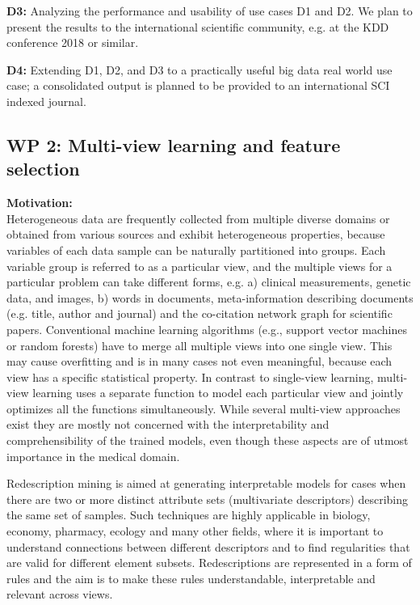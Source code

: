 \documentclass[a4paper,11pt]{article}
\begin{document}
\textbf{D3:} Analyzing the performance and usability of use cases  D1 and D2. We plan to present the results to the international scientific community, e.g. at the KDD conference 2018 or similar.

\textbf{D4:} Extending D1, D2, and D3 to a practically useful big data real world use case; a consolidated output is planned to be provided to an international SCI indexed journal.


\subsection{WP 2: Multi-view learning and feature selection}
%
\textbf{Motivation:}
\\[0,2cm]
Heterogeneous data are frequently collected from multiple diverse domains or obtained from various sources and exhibit heterogeneous properties, because variables of each data sample can be naturally partitioned into groups. Each variable group is referred to as a particular view, and the multiple views for a particular problem can take different forms, e.g. a) clinical measurements, genetic data, and images, b) words in documents, meta-information describing documents (e.g. title, author and journal) and the co-citation network graph for scientific papers. Conventional machine learning algorithms (e.g., support vector machines or random forests) have to merge all multiple views into one single view. This may cause overfitting and is in many cases not even meaningful, because each view has a specific statistical property. In contrast to single-view learning, multi-view learning uses a separate function to model each particular view and jointly optimizes all the functions simultaneously. While several multi-view approaches exist \citep{Sun2013survey} they are mostly not concerned with the interpretability and comprehensibility of the trained models, even though these aspects are of utmost importance in the medical domain. 

Redescription mining is aimed at generating interpretable models for cases when there are two or more distinct attribute sets (multivariate descriptors) describing the same set of samples. Such techniques are highly applicable in biology, economy, pharmacy, ecology and many other fields, where it is important to understand connections between different descriptors and to find regularities that are valid for different element subsets. Redescriptions are represented in a form of rules and the aim is to make these rules understandable, interpretable and relevant across views.
\end{document}
